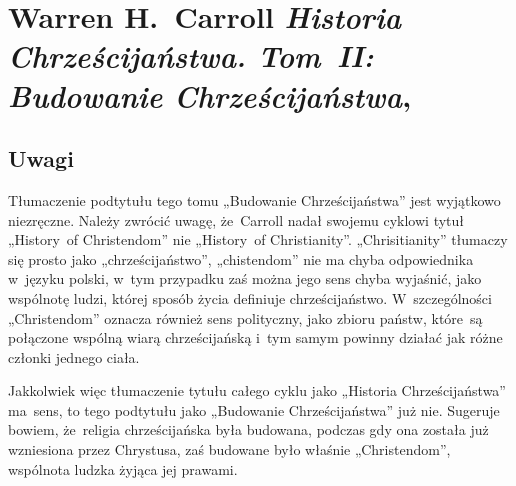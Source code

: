 \documentclass[a4paper,11pt]{article}
\begin{document}










\section{Warren H.~Carroll \textit{Historia Chrześcijaństwa.
    Tom~II: Budowanie Chrześcijaństwa},
  \cite{CarrollHistoriaChrzecijanstwaVolII2010}}



\subsection{Uwagi}



\noindent
Tłumaczenie podtytułu tego tomu „Budowanie Chrześcijaństwa” jest wyjątkowo
niezręczne. Należy zwrócić uwagę, że~Carroll nadał swojemu cyklowi tytuł
„History~of Christendom” nie „History~of Christianity”. „Chrisitianity”
tłumaczy się prosto jako „chrześcijaństwo”, „chistendom” nie ma chyba
odpowiednika w~języku polski, w~tym przypadku zaś można jego sens chyba
wyjaśnić, jako wspólnotę ludzi, której sposób życia definiuje
chrześcijaństwo. W~szczególności „Christendom” oznacza również sens
polityczny, jako zbioru państw, które~są połączone wspólną wiarą
chrześcijańską i~tym samym powinny działać jak różne członki jednego ciała.

Jakkolwiek więc tłumaczenie tytułu całego cyklu jako „Historia
Chrześcijaństwa” ma~sens, to tego podtytułu jako „Budowanie
Chrześcijaństwa” już nie. Sugeruje bowiem, że~religia chrześcijańska
była budowana, podczas gdy ona została już wzniesiona przez Chrystusa,
zaś budowane było właśnie „Christendom”, wspólnota ludzka żyjąca jej
prawami.

\VerSpaceFour










\newpage

\end{document}
